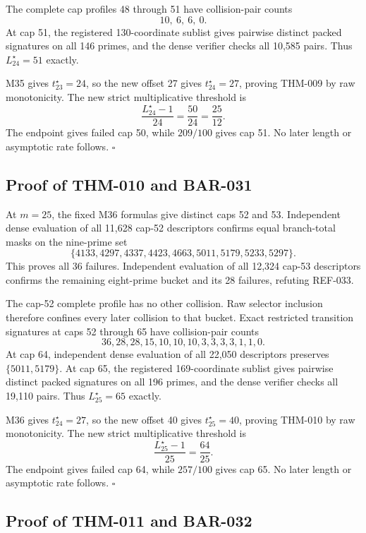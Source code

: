 \documentclass[11pt]{article}
\begin{document}
The complete cap profiles 48 through 51 have collision-pair counts
\[
10,\ 6,\ 6,\ 0.
\]
At cap 51, the registered 130-coordinate sublist gives pairwise distinct
packed signatures on all 146 primes, and the dense verifier checks all 10,585
pairs. Thus \(L_{24}^\star=51\) exactly.

M35 gives \(t_{23}^\star=24\), so the new offset 27 gives
\(t_{24}^\star=27\), proving THM-009 by raw monotonicity. The new strict
multiplicative threshold is
\[
\frac{L_{24}^\star-1}{24}=\frac{50}{24}=\frac{25}{12}.
\]
The endpoint gives failed cap 50, while \(209/100\) gives cap 51. No later
length or asymptotic rate follows. \(\square\)

\subsection{Proof of THM-010 and BAR-031}
\label{proof:THM-010-BAR-031}

At \(m=25\), the fixed M36 formulas give distinct caps 52 and 53.
Independent dense evaluation of all 11,628 cap-52 descriptors confirms equal
branch-total masks on the nine-prime set
\[
\{4133,4297,4337,4423,4663,5011,5179,5233,5297\}.
\]
This proves all 36 failures. Independent evaluation of all 12,324 cap-53
descriptors confirms the remaining eight-prime bucket and its 28 failures,
refuting REF-033.

The cap-52 complete profile has no other collision. Raw selector inclusion
therefore confines every later collision to that bucket. Exact restricted
transition signatures at caps 52 through 65 have collision-pair counts
\[
36,28,28,15,10,10,10,3,3,3,3,1,1,0.
\]
At cap 64, independent dense evaluation of all 22,050 descriptors preserves
\(\{5011,5179\}\). At cap 65, the registered
169-coordinate sublist gives pairwise distinct packed
signatures on all 196 primes, and the dense verifier checks all 19,110 pairs.
Thus \(L_{25}^\star=65\) exactly.

M36 gives \(t_{24}^\star=27\), so the new offset 40 gives
\(t_{25}^\star=40\), proving THM-010 by raw monotonicity. The new strict
multiplicative threshold is
\[
\frac{L_{25}^\star-1}{25}=\frac{64}{25}.
\]
The endpoint gives failed cap 64, while \(257/100\) gives cap 65. No later
length or asymptotic rate follows. \(\square\)

\subsection{Proof of THM-011 and BAR-032}
\label{proof:THM-011-BAR-032}
\end{document}
